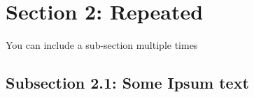\section[S2: Second]{Section 2: Repeated}

You can include a sub-section multiple times

\subsection[S2.1: Ipsum text]{Subsection 2.1: Some Ipsum text}


